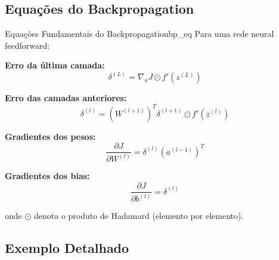 \documentclass[a4paper,12pt]{article}
\newcommand{\grad}[2]{\frac{\partial #1}{\partial #2}}
\begin{document}
\subsection{Equações do Backpropagation}

\begin{definicao}{Equações Fundamentais do Backpropagation}{bp_eq}
Para uma rede neural feedforward:

\textbf{Erro da última camada:}
$$\delta^{(L)} = \nabla_a J \odot f'(z^{(L)})$$

\textbf{Erro das camadas anteriores:}
$$\delta^{(l)} = (W^{(l+1)})^T \delta^{(l+1)} \odot f'(z^{(l)})$$

\textbf{Gradientes dos pesos:}
$$\grad{J}{W^{(l)}} = \delta^{(l)} (a^{(l-1)})^T$$

\textbf{Gradientes dos bias:}
$$\grad{J}{b^{(l)}} = \delta^{(l)}$$

onde $\odot$ denota o produto de Hadamard (elemento por elemento).
\end{definicao}

\subsection{Exemplo Detalhado}
\end{document}
